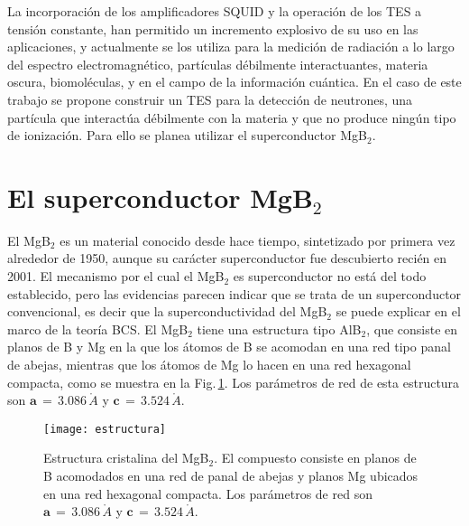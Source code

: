 La incorporación de los amplificadores SQUID y la operación de los TES a tensión constante, han permitido un incremento explosivo de su uso en las aplicaciones, y actualmente se los utiliza para la medición de radiación a lo largo del espectro electromagnético\cite{Irwin2005}, partículas débilmente interactuantes\cite{Irwin2005}, materia oscura\cite{Irwin2005}, biomoléculas\cite{Hilton1998,Irwin2005}, y en el campo de la información cuántica\cite{Smith2012,Irwin2005}. En el caso de este trabajo se propone construir un TES para la detección de neutrones, una partícula que interactúa débilmente con la materia y que no produce ningún tipo de ionización. Para ello se planea utilizar el superconductor MgB$_{2}$.
\section{El superconductor MgB$_2$}\label{S:mgb2}
El MgB$_2$ es un material conocido desde hace tiempo, sintetizado por primera vez alrededor de 1950\cite{Buzea2001}, aunque su carácter superconductor fue descubierto recién en 2001\cite{Nagamatsu2001}. El mecanismo por el cual el MgB$_2$ es superconductor no está del todo establecido, pero las evidencias parecen indicar que se trata de un superconductor convencional, es decir que la superconductividad del MgB$_2$ se puede explicar en el marco de la teoría BCS\cite{Buzea2001}. El MgB$_2$ tiene una estructura tipo AlB$_2$, que consiste en planos de B y Mg en la que los átomos de B se acomodan en una red tipo panal de abejas, mientras que los átomos de Mg lo hacen en una red hexagonal compacta, como se muestra en la Fig.\,\ref{fig:est}. Los parámetros de red de esta estructura son $\mathbf{a} \, = \, 3.086\,\mathring{A}$ y $\mathbf{c} \, = \, 3.524\,\mathring{A}$\cite{Nagamatsu2001}.
\begin{figure}[tbh!]
 \begin{center}
    \texttt{[image: estructura]}
  \end{center}
  \caption[Estructura cristalina del MgB$_2$.]{Estructura cristalina del MgB$_2$. El compuesto consiste en planos de B acomodados en una red
de panal de abejas y planos Mg ubicados en una red hexagonal compacta. Los parámetros de red son
$\mathbf{a} \, = \, 3.086\,\mathring{A}$ y $\mathbf{c} \, = \, 3.524\,\mathring{A}$.}
\label{fig:est}
\end{figure}

